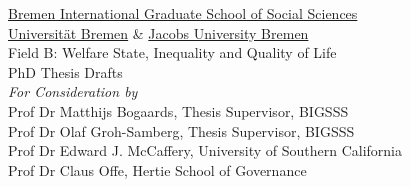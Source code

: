 \begin{titlepage}

\centering

\thispagestyle{empty}

\vspace*{\fill}

			{\Large \href{http://www.bigsss-bremen.de}{Bremen International Graduate School of Social Sciences}}\\
			{\Large \href{http://www.uni-bremen.de}{Universit\"at Bremen} \& \href{http://www.jacobs-university.de}{Jacobs University Bremen}}\\ \vspace{15pt}
			{\Large Field B: Welfare State, Inequality and Quality of Life}\\
			 \vspace{50pt} 
			{\Large PhD Thesis Drafts}\\ 	\vspace{30pt}
			{\Large \emph{For Consideration by}} \\ \vspace{30pt}
			{\large Prof Dr Matthijs Bogaards, Thesis Supervisor, BIGSSS}\\
			{\large Prof Dr Olaf Groh-Samberg, Thesis Supervisor, BIGSSS}\\ 
	\vspace{10pt}
			{\large Prof Dr Edward J. McCaffery, University of Southern California}\\
			{\large Prof Dr Claus Offe, Hertie School of Governance}\\
			\vspace{30pt} 

\vspace*{\fill}
	
\end{titlepage}